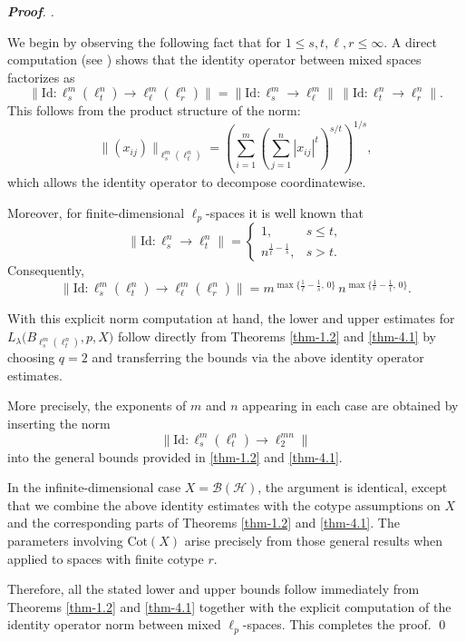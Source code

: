 \documentclass[a4paper,11pt, reqno]{amsart}
\theoremstyle{definition}
\newcounter {own}
\newenvironment{pf}[1][]{%
	\vskip 3mm
	\noindent
	\ifthenelse{\equal{#1}{}}%
	{{\slshape {\bf Proof}. }}%
	{{\slshape #1.} }%
}%
{\qed\bigskip}
\begin{document}
\begin{pf}
	We begin by observing the following fact that for $1 \le s,t,\ell,r \le \infty$.
	A direct computation (see \cite[ p.~188]{defant-2003}) shows that the identity operator 
	between mixed spaces factorizes as
	\[
	\| \mathrm{Id} : \ell_s^m(\ell_t^n) \to \ell_\ell^m(\ell_r^n) \|
	=
	\| \mathrm{Id} : \ell_s^m \to \ell_\ell^m \|
	\,
	\| \mathrm{Id} : \ell_t^n \to \ell_r^n \|.
	\]
	This follows from the product structure of the norm:
	\[
	\|(x_{ij})\|_{\ell_s^m(\ell_t^n)}
	=
	\left( \sum_{i=1}^m 
	\left( \sum_{j=1}^n |x_{ij}|^t \right)^{s/t}
	\right)^{1/s},
	\]
	which allows the identity operator to decompose coordinatewise.
	
	Moreover, for finite-dimensional $\ell_p$-spaces it is well known that
	\[
	\| \mathrm{Id} : \ell_s^n \to \ell_t^n \|
	=
	\begin{cases}
		1, & s \le t, \\[6pt]
		n^{\frac{1}{t}-\frac{1}{s}}, & s > t.
	\end{cases}
	\]
	Consequently,
	\[
	\| \mathrm{Id} : \ell_s^m(\ell_t^n) \to \ell_\ell^m(\ell_r^n) \|
	=
	m^{\max\{ \frac{1}{\ell}-\frac{1}{s},\,0\}}
	\,
	n^{\max\{ \frac{1}{r}-\frac{1}{t},\,0\}}.
	\]
	
	With this explicit norm computation at hand, the lower and upper estimates 
	for $L_\lambda\big(B_{\ell_s^m(\ell_t^n)}, p, X\big)$	
	follow directly from Theorems \ref{thm-1.2} and \ref{thm-4.1} by choosing $q=2$ and transferring the bounds via the above identity 
	operator estimates.
	\par
	More precisely, the exponents of $m$ and $n$ appearing in each case 
	are obtained by inserting the norm 
	\[
	\| \mathrm{Id} : \ell_s^m(\ell_t^n) \to \ell_2^{mn} \|
	\]
	into the general bounds provided in 
	\ref{thm-1.2} and \ref{thm-4.1}. 
	\par
	In the infinite-dimensional case $X = \mathcal{B}(\mathcal{H})$, the argument is identical, 
	except that we combine the above identity estimates with the cotype 
	assumptions on $X$ and the corresponding parts of Theorems \ref{thm-1.2} and \ref{thm-4.1}. 
	The parameters involving $\mathrm{Cot}(X)$ arise precisely from those 
	general results when applied to spaces with finite cotype $r$.
	\par
	Therefore, all the stated lower and upper bounds follow immediately 
	from Theorems \ref{thm-1.2} and \ref{thm-4.1} together with the explicit computation of the identity operator norm between mixed $\ell_p$-spaces. This completes the proof.
\end{pf}
\end{document}
